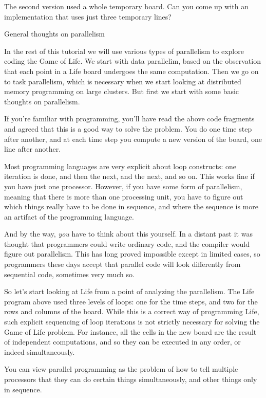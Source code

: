 \begin{exercise}
  The second version used a whole temporary board. Can you come
  up with an implementation that uses just three temporary lines?
\end{exercise}

 {General thoughts on parallelism}

In the rest of this tutorial we will use various types of parallelism
to explore coding the Game of Life. We start with data parallelim,
based on the observation that each point in a Life board undergoes the
same computation. Then we go on to task parallelism, which is necessary
when we start
looking at distributed memory programming on large clusters.
But first we start with some basic thoughts on parallelism.

If you're familiar with programming, you'll have read the 
above code fragments and agreed that this is a good way to 
solve the problem. You do one time step after another, and
at each time step you compute 
a new version of the board, one line after another.

Most programming languages are very explicit about loop constructs: 
one iteration is done, and then the next, and the next, and so on.
This works fine if you 
have just one processor. However, if you have some form of parallelism,
meaning that there is more than one processing unit, you have to 
figure out which things really have to be done in sequence,
and where the sequence is more an artifact of the programming language.

And by the way, \emph{you} have to think about this yourself.
In a distant past it was thought that programmers could write
ordinary code, and the compiler would figure out parallelism. This has
long proved impossible except in limited cases,
so programmers these days accept that parallel
code will look differently from sequential code, sometimes very much so.

So let's start looking at Life from a point of analyzing the parallelism.
The Life program above used three levels of loops: one for the time steps,
and two for the rows and columns of the board. While this is a correct
way of programming Life,
such explicit sequencing of loop iterations
is not strictly necessary for solving the  Game of Life problem. 
For instance,
all the cells in the new board are 
the result of independent computations, and so they
can be executed in any order, or indeed simultaneously.

You can view parallel programming as the problem of how to tell 
multiple processors that they can do certain things simultaneously,
and other things only in sequence.

